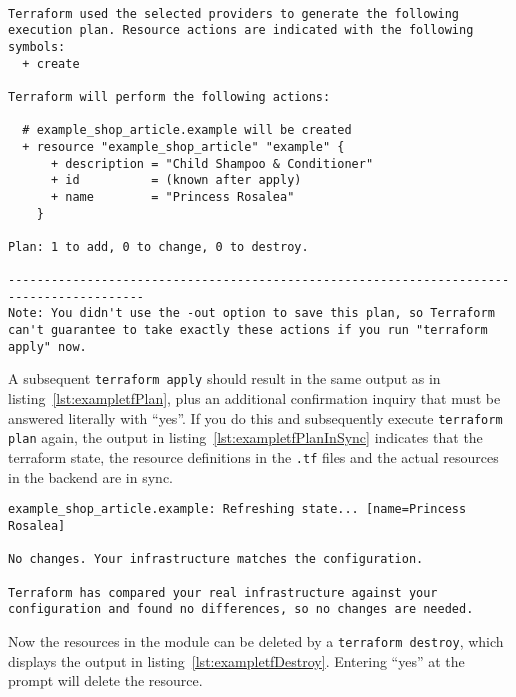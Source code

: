 \documentclass[paper=a4,11pt,numbers=noenddot]{article}
\begin{document}
\begin{lstlisting}[label=lst:exampletfPlan]

Terraform used the selected providers to generate the following execution plan. Resource actions are indicated with the following symbols:
  + create

Terraform will perform the following actions:

  # example_shop_article.example will be created
  + resource "example_shop_article" "example" {
      + description = "Child Shampoo & Conditioner"
      + id          = (known after apply)
      + name        = "Princess Rosalea"
    }

Plan: 1 to add, 0 to change, 0 to destroy.

-----------------------------------------------------------------------------------------
Note: You didn't use the -out option to save this plan, so Terraform can't guarantee to take exactly these actions if you run "terraform apply" now.

\end{lstlisting}

A subsequent \verb'terraform apply' should result in the same output as in listing~\ref{lst:exampletfPlan}, plus an additional confirmation inquiry that must be answered literally with ``yes''. If you do this and subsequently execute \verb'terraform plan' again, the output in listing~\ref{lst:exampletfPlanInSync} indicates that the terraform state, the resource definitions in the \verb'.tf' files and the actual resources in the backend are in sync.

\begin{lstlisting}[label=lst:exampletfPlanInSync]
example_shop_article.example: Refreshing state... [name=Princess Rosalea]

No changes. Your infrastructure matches the configuration.

Terraform has compared your real infrastructure against your configuration and found no differences, so no changes are needed.
\end{lstlisting}

Now the resources in the module can be deleted by a \verb'terraform destroy', which displays the output in listing~\ref{lst:exampletfDestroy}. Entering ``yes'' at the prompt will delete the resource.
\end{document}
